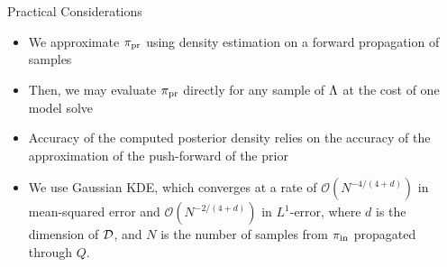 \begin{frame}[t]{Practical Considerations}

\begin{itemize}
	\item We approximate $\operatorname*{\pi_{pr}}$ using density estimation on a forward propagation of samples
	\item Then, we may evaluate $\operatorname*{\pi_{pr}}$ directly for any sample of ${\Lambda}$ at the cost of one model solve
	\item Accuracy of the computed posterior density relies on the accuracy of the approximation of the push-forward of the prior
	\item We use Gaussian KDE, which converges at a rate of $\mathcal{O}(N^{-4/(4+d)})$ in mean-squared error and $\mathcal{O}(N^{-2/(4+d)})$ in $L^1$-error, where $d$ is the dimension of $\mathcal{D}$, and $N$ is the number of samples from $\operatorname*{\pi_{in}}$ propagated through $Q$.

\end{itemize}
\end{frame}
